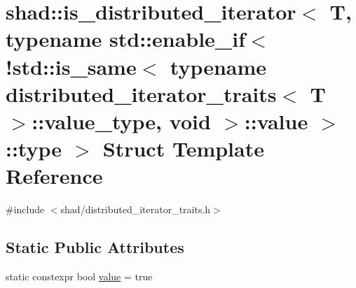 \hypertarget{structshad_1_1is__distributed__iterator_3_01T_00_01typename_01std_1_1enable__if_3_9std_1_1is__sa51db7b1d56bd82f65c31391ac3bbe077}{\section{shad\-:\-:is\-\_\-distributed\-\_\-iterator$<$ T, typename std\-:\-:enable\-\_\-if$<$!std\-:\-:is\-\_\-same$<$ typename distributed\-\_\-iterator\-\_\-traits$<$ T $>$\-:\-:value\-\_\-type, void $>$\-:\-:value $>$\-:\-:type $>$ Struct Template Reference}
\label{structshad_1_1is__distributed__iterator_3_01T_00_01typename_01std_1_1enable__if_3_9std_1_1is__sa51db7b1d56bd82f65c31391ac3bbe077}
}


{\ttfamily \#include $<$shad/distributed\-\_\-iterator\-\_\-traits.\-h$>$}

\subsection*{Static Public Attributes}
\begin{DoxyCompactItemize}
\item 
static constexpr bool \hyperlink{structshad_1_1is__distributed__iterator_3_01T_00_01typename_01std_1_1enable__if_3_9std_1_1is__sa51db7b1d56bd82f65c31391ac3bbe077_a1cfb04895451ff68d946df3e4b15ba7d}{value} = true
\end{DoxyCompactItemize}


